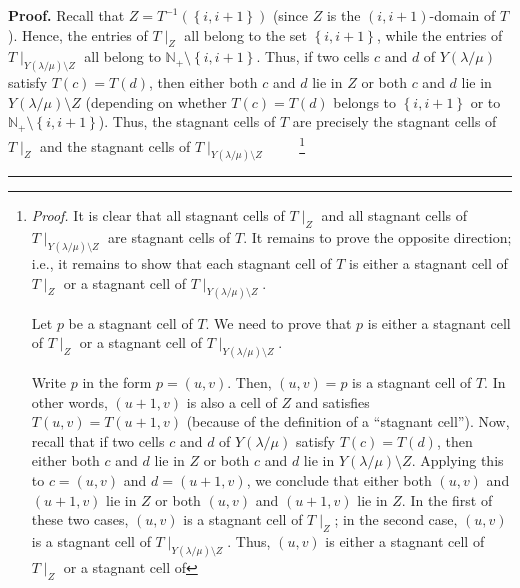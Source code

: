 \documentclass[numbers=enddot,12pt,final,onecolumn,notitlepage]{scrartcl}%
\theoremstyle{definition}
\newenvironment{proof}[1][Proof]{\noindent\textbf{#1.} }{\ \rule{0.5em}{0.5em}}
\newenvironment{verlong}{}{}
\begin{document}
\begin{verlong}
\begin{proof}
Recall that $Z=T^{-1}\left(  \left\{  i,i+1\right\}  \right)  $ (since $Z$ is
the $\left(  i,i+1\right)  $-domain of $T$). Hence, the entries of $T\mid_{Z}$
all belong to the set $\left\{  i,i+1\right\}  $, while the entries of
$T\mid_{Y\left(  \lambda/\mu\right)  \setminus Z}$ all belong to
$\mathbb{N}_{+}\setminus\left\{  i,i+1\right\}  $. Thus, if two cells $c$ and
$d$ of $Y\left(  \lambda/\mu\right)  $ satisfy $T\left(  c\right)  =T\left(
d\right)  $, then either both $c$ and $d$ lie in $Z$ or both $c$ and $d$ lie
in $Y\left(  \lambda/\mu\right)  \setminus Z$ (depending on whether $T\left(
c\right)  =T\left(  d\right)  $ belongs to $\left\{  i,i+1\right\}  $ or to
$\mathbb{N}_{+}\setminus\left\{  i,i+1\right\}  $). Thus, the stagnant cells
of $T$ are precisely the stagnant cells of $T\mid_{Z}$ and the stagnant cells
of $T\mid_{Y\left(  \lambda/\mu\right)  \setminus Z}$%
\ \ \ \ \footnote{\textit{Proof.} It is clear that all stagnant cells of
$T\mid_{Z}$ and all stagnant cells of $T\mid_{Y\left(  \lambda/\mu\right)
\setminus Z}$ are stagnant cells of $T$. It remains to prove the opposite
direction; i.e., it remains to show that each stagnant cell of $T$ is either a
stagnant cell of $T\mid_{Z}$ or a stagnant cell of $T\mid_{Y\left(
\lambda/\mu\right)  \setminus Z}$.
\par
Let $p$ be a stagnant cell of $T$. We need to prove that $p$ is either a
stagnant cell of $T\mid_{Z}$ or a stagnant cell of $T\mid_{Y\left(
\lambda/\mu\right)  \setminus Z}$.
\par
Write $p$ in the form $p=\left(  u,v\right)  $. Then, $\left(  u,v\right)  =p$
is a stagnant cell of $T$. In other words, $\left(  u+1,v\right)  $ is also a
cell of $Z$ and satisfies $T\left(  u,v\right)  =T\left(  u+1,v\right)  $
(because of the definition of a \textquotedblleft stagnant
cell\textquotedblright). Now, recall that if two cells $c$ and $d$ of
$Y\left(  \lambda/\mu\right)  $ satisfy $T\left(  c\right)  =T\left(
d\right)  $, then either both $c$ and $d$ lie in $Z$ or both $c$ and $d$ lie
in $Y\left(  \lambda/\mu\right)  \setminus Z$. Applying this to $c=\left(
u,v\right)  $ and $d=\left(  u+1,v\right)  $, we conclude that either both
$\left(  u,v\right)  $ and $\left(  u+1,v\right)  $ lie in $Z$ or both
$\left(  u,v\right)  $ and $\left(  u+1,v\right)  $ lie in $Z$. In the first
of these two cases, $\left(  u,v\right)  $ is a stagnant cell of $T\mid_{Z}$;
in the second case, $\left(  u,v\right)  $ is a stagnant cell of
$T\mid_{Y\left(  \lambda/\mu\right)  \setminus Z}$. Thus, $\left(  u,v\right)
$ is either a stagnant cell of $T\mid_{Z}$ or a stagnant cell of
}
\end{proof}
\end{verlong}
\end{document}

